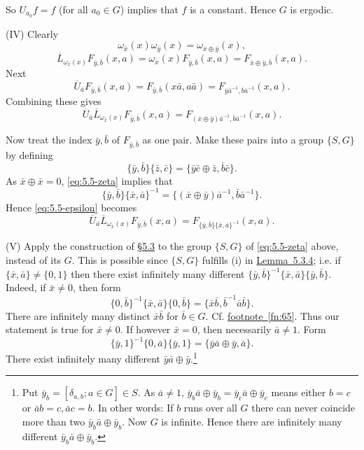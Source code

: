 \documentclass[b5paper,twoside]{article}
\newcommand{\secref}[2]{\hyperref[#1]{\mbox{\S#2}}}
\newcommand{\lemref}[2]{\hyperref[#1]{\mbox{Lemma~#2}}}
\theoremstyle{mvnplain}
\def\mathfrak#1{#1}%
\begin{document}
So \(U_{a_0}f=f\) (for all \(a_0\in\mathfrak G\)) implies that \(f\) is a
constant. Hence \(\mathfrak G\) is ergodic.

(IV) Clearly
\[
 \omega_{\bar x}(x)\omega_{\bar y}(x)=
 \omega_{\bar x\oplus\bar y}(x),
\]
\[
 \overline L_{\omega_{\bar x}(x)}F_{\bar y,\bar b}(x,a)
 =\omega_{\bar x}(x)F_{\bar y,\bar b}(x,a)
 =F_{\bar x\oplus\bar y,\bar b}(x,a).
\]
Next
\[
 \overline U_{\bar a}F_{\bar y,\bar b}(x,a)
 =F_{\bar y,\bar b}(x\bar a,a\bar a)
 =F_{\bar y\bar a^{-1},\bar b\bar a^{-1}}(x,a).
\]
Combining these gives
\begin{equation}\tag{5.5.\(\epsilon\)}\label{eq:5.5-epsilon}
 \overline U_{\bar a}\overline L_{\omega_{\bar x}(x)}
 F_{\bar y,\bar b}(x,a)
 =F_{(\bar x\oplus\bar y)\bar a^{-1},\bar b\bar a^{-1}}(x,a).
\end{equation}

Now treat the index \(\bar y,\bar b\) of \(F_{\bar y,\bar b}\) as one pair.
Make these pairs into a group \(\{\mathfrak S,\mathfrak G\}\) by defining
\begin{equation}\tag{5.5.\(\zeta\)}\label{eq:5.5-zeta}
 \{\bar y,\bar b\}\{\bar z,\bar c\}
 =\{\bar y\bar c\oplus\bar z,\bar b\bar c\}.
\end{equation}
As \(\bar x\oplus\bar x=0\), \eqref{eq:5.5-zeta} implies that
\[
 \{\bar y,\bar b\}\{\bar x,\bar a\}^{-1}
 =\{(\bar x\oplus\bar y)\bar a^{-1},\bar b\bar a^{-1}\}.
\]
Hence \eqref{eq:5.5-epsilon} becomes
\begin{equation}\tag{5.5.\(\eta\)}\label{eq:5.5-eta}
 \overline U_{\bar a}\overline L_{\omega_{\bar x}(x)}
 F_{\bar y,\bar b}(x,a)
 =F_{\{\bar y,\bar b\}\{\bar x,\bar a\}^{-1}}(x,a).
\end{equation}

(V) Apply the construction of \secref{sec:5.3}{5.3} to the group
\(\{\mathfrak S,\mathfrak G\}\) of \eqref{eq:5.5-zeta} above, instead of
its \(\mathfrak G\). This is possible since
\(\{\mathfrak S,\mathfrak G\}\) fulfills (i) in
\lemref{lem:5.3.4}{5.3.4}; i.e. if
\(\{\bar x,\bar a\}\ne\{0,1\}\) then there exist infinitely many different
\(\{\bar y,\bar b\}^{-1}\{\bar x,\bar a\}\{\bar y,\bar b\}\). Indeed, if
\(\bar x\ne0\), then form
\[
 \{0,\bar b\}^{-1}\{\bar x,\bar a\}\{0,\bar b\}
 =\{\bar x\bar b,\bar b^{-1}\bar a\bar b\}.
\]
There are infinitely many distinct \(\bar x\bar b\) for
\(\bar b\in\mathfrak G\). Cf.
\hyperref[fn:65]{footnote~\ref*{fn:65}}. Thus our statement is true for
\(\bar x\ne0\). If however \(\bar x=0\), then necessarily \(\bar a\ne1\).
Form
\[
 \{\bar y,1\}^{-1}\{0,\bar a\}\{\bar y,1\}
 =\{\bar y\bar a\oplus\bar y,\bar a\}.
\]
There exist infinitely many different \(\bar y\bar a\oplus\bar y\).\footnote{
Put \(\bar y_b=[\delta_{a,b};a\in\mathfrak G]\in\mathfrak S\). As
\(\bar a\ne1\),
\(\bar y_b\bar a\oplus\bar y_b=\bar y_c\bar a\oplus\bar y_c\) means either
\(b=c\) or \(\bar ab=c,\bar ac=b\). In other words: If \(b\) runs over all
\(\mathfrak G\) there can never coincide more than two
\(\bar y_b\bar a\oplus\bar y_b\). Now \(\mathfrak G\) is infinite. Hence
there are infinitely many different \(\bar y_b\bar a\oplus\bar y_b\).}
\end{document}
